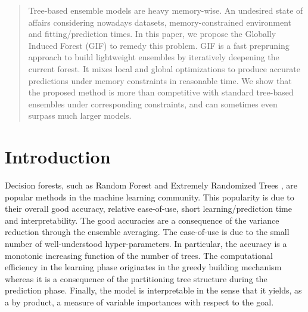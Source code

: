 \documentclass{article}
\begin{document}
 


\begin{abstract} 
Tree-based ensemble models are heavy memory-wise. An undesired state of affairs 
considering nowadays datasets, memory-constrained environment and 
fitting/prediction times.
In this paper, we propose the Globally Induced Forest (GIF) to remedy this 
problem. GIF is a fast prepruning approach to build lightweight ensembles by 
iteratively deepening the current forest. It mixes local and global 
optimizations to produce accurate predictions under memory constraints in 
reasonable time.
We show that the proposed method is more than competitive with standard 
tree-based ensembles under corresponding constraints, and can sometimes even 
surpass much larger models. 
\end{abstract} 

\section{Introduction}
\label{sec:introduction}

Decision forests, such as Random Forest \cite{breiman2001random} and Extremely 
Randomized Trees \cite{extratrees}, are popular methods in the machine 
learning community. This popularity is due to their overall good accuracy, 
relative ease-of-use, short learning/prediction time and interpretability. The 
good accuracies are a consequence of the variance reduction through the 
ensemble averaging. The ease-of-use is due to the small number of 
well-understood hyper-parameters. In particular, the accuracy is a monotonic 
increasing function of the number of trees.
The computational efficiency in the learning phase originates in the greedy 
building mechanism whereas it is a consequence of the partitioning tree 
structure during the prediction phase. Finally, the model is interpretable in 
the sense that it yields, as a by product, a measure of variable importances 
with respect to the goal.
\end{document}
